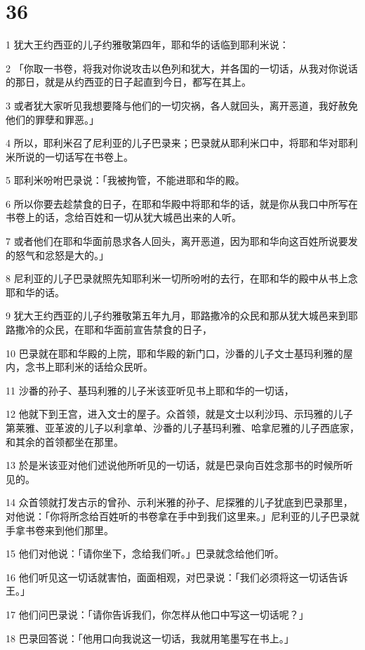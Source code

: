 \chapter{36}

\par 1 犹大王约西亚的儿子约雅敬第四年，耶和华的话临到耶利米说：
\par 2 「你取一书卷，将我对你说攻击以色列和犹大，并各国的一切话，从我对你说话的那日，就是从约西亚的日子起直到今日，都写在其上。
\par 3 或者犹大家听见我想要降与他们的一切灾祸，各人就回头，离开恶道，我好赦免他们的罪孽和罪恶。」
\par 4 所以，耶利米召了尼利亚的儿子巴录来；巴录就从耶利米口中，将耶和华对耶利米所说的一切话写在书卷上。
\par 5 耶利米吩咐巴录说：「我被拘管，不能进耶和华的殿。
\par 6 所以你要去趁禁食的日子，在耶和华殿中将耶和华的话，就是你从我口中所写在书卷上的话，念给百姓和一切从犹大城邑出来的人听。
\par 7 或者他们在耶和华面前恳求各人回头，离开恶道，因为耶和华向这百姓所说要发的怒气和忿怒是大的。」
\par 8 尼利亚的儿子巴录就照先知耶利米一切所吩咐的去行，在耶和华的殿中从书上念耶和华的话。
\par 9 犹大王约西亚的儿子约雅敬第五年九月，耶路撒冷的众民和那从犹大城邑来到耶路撒冷的众民，在耶和华面前宣告禁食的日子，
\par 10 巴录就在耶和华殿的上院，耶和华殿的新门口，沙番的儿子文士基玛利雅的屋内，念书上耶利米的话给众民听。
\par 11 沙番的孙子、基玛利雅的儿子米该亚听见书上耶和华的一切话，
\par 12 他就下到王宫，进入文士的屋子。众首领，就是文士以利沙玛、示玛雅的儿子第莱雅、亚革波的儿子以利拿单、沙番的儿子基玛利雅、哈拿尼雅的儿子西底家，和其余的首领都坐在那里。
\par 13 於是米该亚对他们述说他所听见的一切话，就是巴录向百姓念那书的时候所听见的。
\par 14 众首领就打发古示的曾孙、示利米雅的孙子、尼探雅的儿子犹底到巴录那里，对他说：「你将所念给百姓听的书卷拿在手中到我们这里来。」尼利亚的儿子巴录就手拿书卷来到他们那里。
\par 15 他们对他说：「请你坐下，念给我们听。」巴录就念给他们听。
\par 16 他们听见这一切话就害怕，面面相观，对巴录说：「我们必须将这一切话告诉王。」
\par 17 他们问巴录说：「请你告诉我们，你怎样从他口中写这一切话呢？」
\par 18 巴录回答说：「他用口向我说这一切话，我就用笔墨写在书上。」
